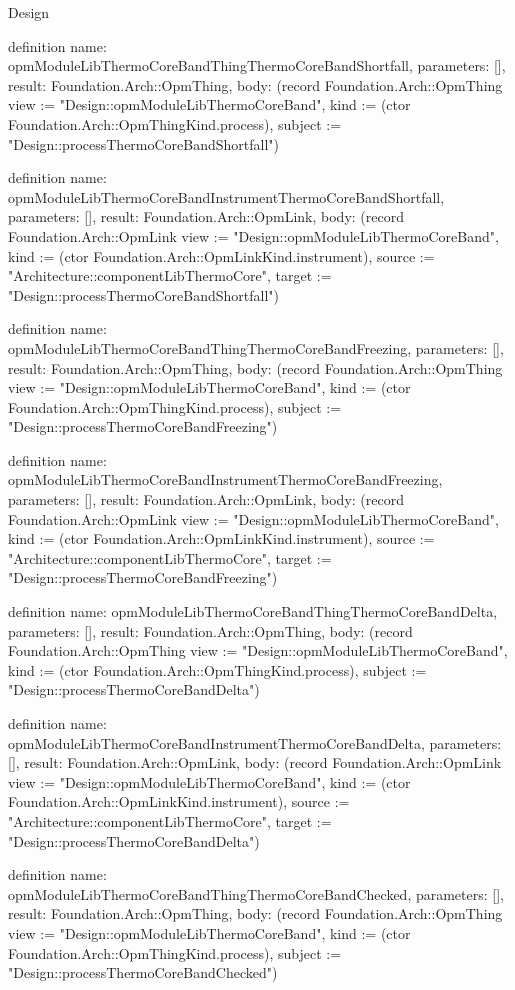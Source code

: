 \begin{lexlean}{Design}
\begin{semanticmodule}
definition{
  name: opmModuleLibThermoCoreBandThingThermoCoreBandShortfall,
  parameters: [],
  result: Foundation.Arch::OpmThing,
  body: (record Foundation.Arch::OpmThing {view := "Design::opmModuleLibThermoCoreBand", kind := (ctor Foundation.Arch::OpmThingKind.process), subject := "Design::processThermoCoreBandShortfall"})
}

definition{
  name: opmModuleLibThermoCoreBandInstrumentThermoCoreBandShortfall,
  parameters: [],
  result: Foundation.Arch::OpmLink,
  body: (record Foundation.Arch::OpmLink {view := "Design::opmModuleLibThermoCoreBand", kind := (ctor Foundation.Arch::OpmLinkKind.instrument), source := "Architecture::componentLibThermoCore", target := "Design::processThermoCoreBandShortfall"})
}

definition{
  name: opmModuleLibThermoCoreBandThingThermoCoreBandFreezing,
  parameters: [],
  result: Foundation.Arch::OpmThing,
  body: (record Foundation.Arch::OpmThing {view := "Design::opmModuleLibThermoCoreBand", kind := (ctor Foundation.Arch::OpmThingKind.process), subject := "Design::processThermoCoreBandFreezing"})
}

definition{
  name: opmModuleLibThermoCoreBandInstrumentThermoCoreBandFreezing,
  parameters: [],
  result: Foundation.Arch::OpmLink,
  body: (record Foundation.Arch::OpmLink {view := "Design::opmModuleLibThermoCoreBand", kind := (ctor Foundation.Arch::OpmLinkKind.instrument), source := "Architecture::componentLibThermoCore", target := "Design::processThermoCoreBandFreezing"})
}

definition{
  name: opmModuleLibThermoCoreBandThingThermoCoreBandDelta,
  parameters: [],
  result: Foundation.Arch::OpmThing,
  body: (record Foundation.Arch::OpmThing {view := "Design::opmModuleLibThermoCoreBand", kind := (ctor Foundation.Arch::OpmThingKind.process), subject := "Design::processThermoCoreBandDelta"})
}

definition{
  name: opmModuleLibThermoCoreBandInstrumentThermoCoreBandDelta,
  parameters: [],
  result: Foundation.Arch::OpmLink,
  body: (record Foundation.Arch::OpmLink {view := "Design::opmModuleLibThermoCoreBand", kind := (ctor Foundation.Arch::OpmLinkKind.instrument), source := "Architecture::componentLibThermoCore", target := "Design::processThermoCoreBandDelta"})
}

definition{
  name: opmModuleLibThermoCoreBandThingThermoCoreBandChecked,
  parameters: [],
  result: Foundation.Arch::OpmThing,
  body: (record Foundation.Arch::OpmThing {view := "Design::opmModuleLibThermoCoreBand", kind := (ctor Foundation.Arch::OpmThingKind.process), subject := "Design::processThermoCoreBandChecked"})
}


\end{semanticmodule}
\end{lexlean}
